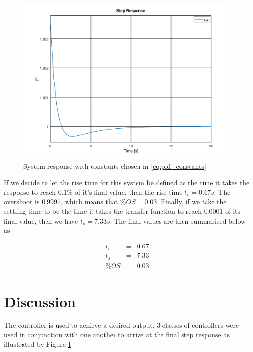 \documentclass[a4paper, 12pt]{article}
\begin{document}
\begin{figure}[H]
	\centering
	\includegraphics[width=\textwidth]{response.png}
	\caption{System response with constants chosen in \eqref{eq:pid_constants}}
	\label{fig:response}
\end{figure}

If we decide to let the rise time for this system be defined as the time it
takes the response to reach 0.1\% of it's final value, then the rise time $t_r
= 0.67s$. The overshoot is 0.9997, which means that $\%OS = 0.03$. Finally, if
we take the settling time to be the time it takes the transfer function to
reach 0.0001 of its final value, then we have $t_s = 7.33s$. The final values
are then summarised below as

\begin{equation}
  \begin{array}{rcl}
    t_r & = & 0.67 \\
    t_s & = & 7.33 \\
    \%OS & = & 0.03 \\
  \end{array}
  \label{eq:finalstats}
\end{equation}

\section{Discussion} %
\label{sec:discussion}
The controller is used to achieve a desired output. 3 classes of controllers were used in conjunction with one another to arrive at the final step response as illustrated by Figure \ref{fig:response}
\end{document}
